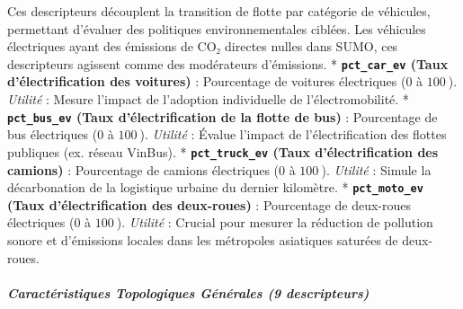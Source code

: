 \documentclass[10pt, a4paper]{article}
\begin{document}
Ces descripteurs découplent la transition de flotte par catégorie de
véhicules, permettant d'évaluer des politiques environnementales
ciblées. Les véhicules électriques ayant des émissions de CO₂ directes
nulles dans SUMO, ces descripteurs agissent comme des modérateurs
d'émissions. * \textbf{\texttt{pct\_car\_ev} (Taux d'électrification des
voitures)} : Pourcentage de voitures électriques (\(0\) à \(100\ %
\)). \emph{Utilité} : Mesure l'impact de l'adoption individuelle de
l'électromobilité. * \textbf{\texttt{pct\_bus\_ev} (Taux
d'électrification de la flotte de bus)} : Pourcentage de bus électriques
(\(0\) à \(100\ %
\)). \emph{Utilité} : Évalue l'impact de l'électrification des flottes
publiques (ex. réseau VinBus). * \textbf{\texttt{pct\_truck\_ev} (Taux
d'électrification des camions)} : Pourcentage de camions électriques
(\(0\) à \(100\ %
\)). \emph{Utilité} : Simule la décarbonation de la logistique urbaine
du dernier kilomètre. * \textbf{\texttt{pct\_moto\_ev} (Taux
d'électrification des deux-roues)} : Pourcentage de deux-roues
électriques (\(0\) à \(100\ %
\)). \emph{Utilité} : Crucial pour mesurer la réduction de pollution
sonore et d'émissions locales dans les métropoles asiatiques saturées de
deux-roues.

\subparagraph{Caractéristiques Topologiques Générales (9
descripteurs)}\label{caractuxe9ristiques-topologiques-guxe9nuxe9rales-9-descripteurs}
\end{document}
